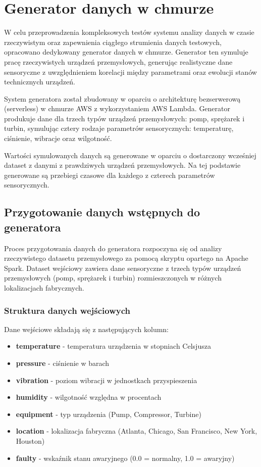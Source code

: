 \section{Generator danych w chmurze}
\label{sec:implementacja_generowania}

W celu przeprowadzenia kompleksowych testów systemu analizy danych w czasie rzeczywistym oraz zapewnienia ciągłego strumienia danych testowych, opracowano dedykowany generator danych w chmurze. Generator ten symuluje pracę rzeczywistych urządzeń przemysłowych, generując realistyczne dane sensoryczne z uwzględnieniem korelacji między parametrami oraz ewolucji stanów technicznych urządzeń.

System generatora został zbudowany w oparciu o architekturę bezserwerową (serverless) w chmurze AWS z wykorzystaniem AWS Lambda. Generator produkuje dane dla trzech typów urządzeń przemysłowych: pomp, sprężarek i turbin, symulując cztery rodzaje parametrów sensorycznych: temperaturę, ciśnienie, wibracje oraz wilgotność.

Wartości symulowanych danych są generowane w oparciu o dostarczony wcześniej dataset z danymi z prawdziwych urządzeń przemysłowych. Na tej podstawie generowane są przebiegi czasowe dla każdego z czterech parametrów sensorycznych.

\subsection{Przygotowanie danych wstępnych do generatora}

Proces przygotowania danych do generatora rozpoczyna się od analizy rzeczywistego datasetu przemysłowego za pomocą skryptu opartego na Apache Spark. Dataset wejściowy zawiera dane sensoryczne z trzech typów urządzeń przemysłowych (pomp, sprężarek i turbin) rozmieszczonych w różnych lokalizacjach fabrycznych.

\subsubsection{Struktura danych wejściowych}

Dane wejściowe składają się z następujących kolumn:
\begin{itemize}
    \item \textbf{temperature} - temperatura urządzenia w stopniach Celsjusza
    \item \textbf{pressure} - ciśnienie w barach
    \item \textbf{vibration} - poziom wibracji w jednostkach przyspieszenia
    \item \textbf{humidity} - wilgotność względna w procentach
    \item \textbf{equipment} - typ urządzenia (Pump, Compressor, Turbine)
    \item \textbf{location} - lokalizacja fabryczna (Atlanta, Chicago, San Francisco, New York, Houston)
    \item \textbf{faulty} - wskaźnik stanu awaryjnego (0.0 = normalny, 1.0 = awaryjny)
\end{itemize}


